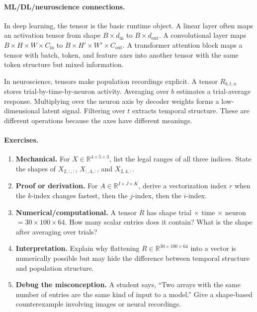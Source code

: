 \paragraph{ML/DL/neuroscience connections.}
In deep learning, the tensor is the basic runtime object. A linear layer often maps an activation tensor from shape \(B\times d_{\mathrm{in}}\) to \(B\times d_{\mathrm{out}}\). A convolutional layer maps \(B\times H\times W\times C_{\mathrm{in}}\) to \(B\times H'\times W'\times C_{\mathrm{out}}\). A transformer attention block maps a tensor with batch, token, and feature axes into another tensor with the same token structure but mixed information.

In neuroscience, tensors make population recordings explicit. A tensor \(R_{b,t,n}\) stores trial-by-time-by-neuron activity. Averaging over \(b\) estimates a trial-average response. Multiplying over the neuron axis by decoder weights forms a low-dimensional latent signal. Filtering over \(t\) extracts temporal structure. These are different operations because the axes have different meanings.

\paragraph{Exercises.}
\begin{enumerate}[label=\textbf{7.1.\arabic*.}, leftmargin=*]
\item \textbf{Mechanical.} For \(X\in\mathbb{R}^{4\times 5\times 3}\), list the legal ranges of all three indices. State the shapes of \(X_{2,:,:}\), \(X_{:,4,:}\), and \(X_{2,4,:}\).
\item \textbf{Proof or derivation.} For \(A\in\mathbb{R}^{I\times J\times K}\), derive a vectorization index \(r\) when the \(k\)-index changes fastest, then the \(j\)-index, then the \(i\)-index.
\item \textbf{Numerical/computational.} A tensor \(R\) has shape trial \(\times\) time \(\times\) neuron \(=30\times 100\times 64\). How many scalar entries does it contain? What is the shape after averaging over trials?
\item \textbf{Interpretation.} Explain why flattening \(R\in\mathbb{R}^{30\times 100\times 64}\) into a vector is numerically possible but may hide the difference between temporal structure and population structure.
\item \textbf{Debug the misconception.} A student says, ``Two arrays with the same number of entries are the same kind of input to a model.'' Give a shape-based counterexample involving images or neural recordings.
\end{enumerate}


